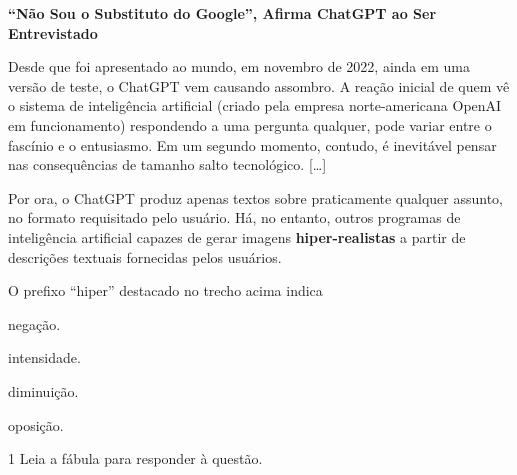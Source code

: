 \begin{myquote}
\textbf{``Não Sou o Substituto do Google'', Afirma ChatGPT ao Ser Entrevistado}

Desde que foi apresentado ao mundo, em novembro de 2022, ainda em uma
versão de teste, o ChatGPT vem causando assombro. A reação inicial de
quem vê o sistema de inteligência artificial (criado pela empresa
norte-americana OpenAI em funcionamento) respondendo a uma pergunta
qualquer, pode variar entre o fascínio e o entusiasmo. Em um segundo
momento, contudo, é inevitável pensar nas consequências de tamanho salto
tecnológico. {[}\ldots{}{]}

Por ora, o ChatGPT produz apenas textos sobre praticamente qualquer
assunto, no formato requisitado pelo usuário. Há, no entanto, outros
programas de inteligência artificial capazes de gerar imagens
\textbf{hiper-realistas} a partir de descrições textuais fornecidas pelos
usuários.

\end{myquote}

O prefixo ``hiper'' destacado no trecho acima indica

\begin{escolha}
  \item negação.

  \item intensidade.

  \item diminuição.

  \item oposição.
\end{escolha}
\pagebreak

\vspace*{-3.4cm}
\hspace*{-3.7cm}%
\pagebreak

\num{1} Leia a fábula para responder à questão.


